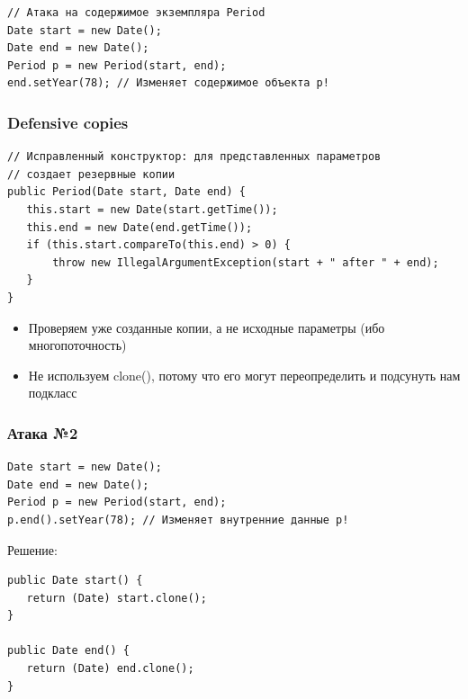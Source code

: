 \documentclass[xetex,mathserif,serif]{beamer}
\begin{document}
	\begin{frame}[fragile]
		\begin{verbatim}
// Атака на содержимое экземпляра Period
Date start = new Date();
Date end = new Date();
Period p = new Period(start, end);
end.setYear(78); // Изменяет содержимое объекта p!
		\end{verbatim}
	\end{frame}

	\begin{frame}[fragile]
		\frametitle{Defensive copies}
		\begin{verbatim}
// Исправленный конструктор: для представленных параметров
// создает резервные копии
public Period(Date start, Date end) {
   this.start = new Date(start.getTime());
   this.end = new Date(end.getTime());
   if (this.start.compareTo(this.end) > 0) {
       throw new IllegalArgumentException(start + " after " + end);
   }
}
		\end{verbatim}
		\begin{itemize}
			\item Проверяем уже созданные копии, а не исходные параметры (ибо многопоточность)
			\item Не используем clone(), потому что его могут переопределить и подсунуть нам подкласс
		\end{itemize}
	\end{frame}

	\begin{frame}[fragile]
		\frametitle{Атака №2}
		\begin{verbatim}
Date start = new Date();
Date end = new Date();
Period p = new Period(start, end);
p.end().setYear(78); // Изменяет внутренние данные p!
		\end{verbatim}
		\vspace{3mm}
		\pause
		Решение:
		\begin{verbatim}
public Date start() {
   return (Date) start.clone();
}

public Date end() {
   return (Date) end.clone();
}
		\end{verbatim}
	\end{frame}
\end{document}
